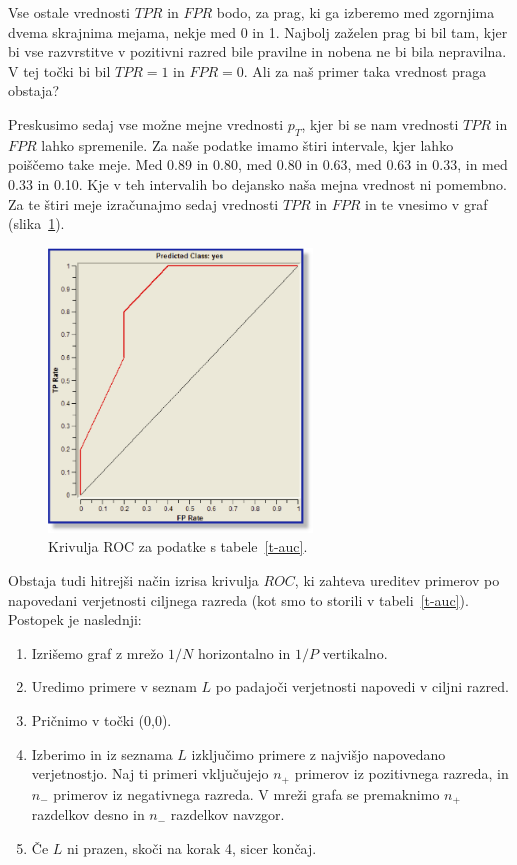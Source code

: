 Vse ostale vrednosti $TPR$ in $FPR$ bodo, za prag, ki ga izberemo med zgornjima dvema skrajnima mejama, nekje med 0 in 1. Najbolj zaželen prag bi bil tam, kjer bi vse razvrstitve v pozitivni razred bile pravilne in nobena ne bi bila nepravilna. V tej točki bi bil $TPR=1$ in $FPR=0$. Ali za naš primer taka vrednost praga obstaja?

Preskusimo sedaj vse možne mejne vrednosti $p_T$, kjer bi se nam vrednosti $TPR$ in $FPR$ lahko spremenile. Za naše podatke imamo štiri intervale, kjer lahko poiščemo take meje. Med 0.89 in 0.80, med 0.80 in 0.63, med 0.63 in 0.33, in med 0.33 in 0.10. Kje v teh intervalih bo dejansko naša mejna vrednost ni pomembno. Za te štiri meje izračunajmo sedaj vrednosti $TPR$ in $FPR$ in te vnesimo v graf (slika~\ref{f-roc}).

\begin{figure}[htbp]
\begin{center}
\includegraphics[width=7cm]{slike/roc.png}
\caption{Krivulja ROC za podatke s tabele~\ref{t-auc}.}
\label{f-roc}
\end{center}
\end{figure}

Obstaja tudi hitrejši način izrisa krivulja $ROC$, ki zahteva ureditev primerov po napovedani verjetnosti ciljnega razreda (kot smo to storili v tabeli~\ref{t-auc}). Postopek je naslednji:
%
\begin{enumerate}
\item Izrišemo graf z mrežo $1/N$ horizontalno in $1/P$ vertikalno.
\item Uredimo primere v seznam $L$ po padajoči verjetnosti napovedi v ciljni razred.
\item Pričnimo v točki (0,0).
\item Izberimo in iz seznama $L$ izključimo primere z najvišjo napovedano verjetnostjo. Naj ti primeri vključujejo $n_+$ primerov iz pozitivnega razreda, in $n_-$ primerov iz negativnega razreda. V mreži grafa se premaknimo $n_+$ razdelkov desno in $n_-$ razdelkov navzgor.
\item Če $L$ ni prazen, skoči na korak 4, sicer končaj.
\end{enumerate}

